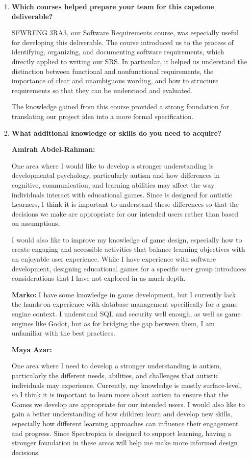 \documentclass[12pt]{article}
\begin{document}
\begin{enumerate}
\item \textbf{Which courses helped prepare your team for this capstone
deliverable?}

SFWRENG 3RA3, our Software Requirements course, was especially useful for
developing this deliverable. The course introduced us to the process of
identifying, organizing, and documenting software requirements, which directly
applied to writing our SRS. In particular, it helped us understand the
distinction between functional and nonfunctional requirements, the importance of
clear and unambiguous wording, and how to structure requirements so that they
can be understood and evaluated.

The knowledge gained from this course provided a strong foundation for
translating our project idea into a more formal specification.

\item \textbf{What additional knowledge or skills do you need to acquire?}

\textbf{Amirah Abdel-Rahman:}

One area where I would like to develop a stronger understanding is developmental
psychology, particularly autism and how differences in cognitive, communication,
and learning abilities may affect the way individuals interact with educational
games. Since \progname{} is designed for autistic Learners, I think it is
important to understand these differences so that the decisions we make are
appropriate for our intended users rather than based on assumptions.

I would also like to improve my knowledge of game design, especially how to
create engaging and accessible activities that balance learning objectives with
an enjoyable user experience. While I have experience with software development,
designing educational games for a specific user group introduces considerations
that I have not explored in as much depth.

\textbf{Marko:} I have some knowledge in game development, but I currently lack
the hands-on experience with database management specifically for a game engine
context. I understand SQL and security well enough, as well as game engines like
Godot, but as for bridging the gap between them, I am unfamiliar with the best
practices.

\textbf{Maya Azar:}

One area where I need to develop a stronger understanding is autism,
particularly the different needs, abilities, and challenges that autistic
individuals may experience. Currently, my knowledge is mostly surface-level, so
I think it is important to learn more about autism to ensure that the Games we
develop are appropriate for our intended users. I would also like to gain a
better understanding of how children learn and develop new skills, especially
how different learning approaches can influence their engagement and progress.
Since Spectropica is designed to support learning, having a stronger foundation
in these areas will help me make more informed design decisions.


\end{enumerate}
\end{document}

